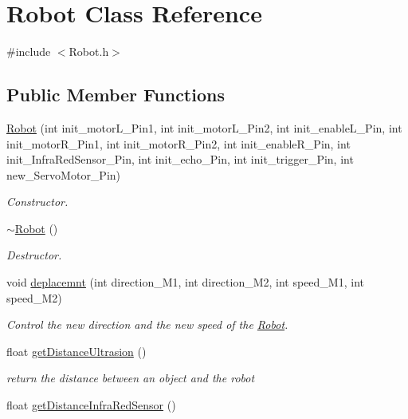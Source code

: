 \hypertarget{class_robot}{}\section{Robot Class Reference}
\label{class_robot}


{\ttfamily \#include $<$Robot.\+h$>$}

\subsection*{Public Member Functions}
\begin{DoxyCompactItemize}
\item 
\hyperlink{class_robot_a48d1e4e995ff63500905212178deb76a}{Robot} (int init\+\_\+motor\+L\+\_\+\+Pin1, int init\+\_\+motor\+L\+\_\+\+Pin2, int init\+\_\+enable\+L\+\_\+\+Pin, int init\+\_\+motor\+R\+\_\+\+Pin1, int init\+\_\+motor\+R\+\_\+\+Pin2, int init\+\_\+enable\+R\+\_\+\+Pin, int init\+\_\+\+Infra\+Red\+Sensor\+\_\+\+Pin, int init\+\_\+echo\+\_\+\+Pin, int init\+\_\+trigger\+\_\+\+Pin, int new\+\_\+\+Servo\+Motor\+\_\+\+Pin)
\begin{DoxyCompactList}\small\item\em Constructor. \end{DoxyCompactList}\item 
\hyperlink{class_robot_a924320124b09c2f2ac1621aa210d5f38}{$\sim$\+Robot} ()
\begin{DoxyCompactList}\small\item\em Destructor. \end{DoxyCompactList}\item 
void \hyperlink{class_robot_a53edd4c7204f04d0bb3e97f1f1574755}{deplacemnt} (int direction\+\_\+\+M1, int direction\+\_\+\+M2, int speed\+\_\+\+M1, int speed\+\_\+\+M2)
\begin{DoxyCompactList}\small\item\em Control the new direction and the new speed of the \hyperlink{class_robot}{Robot}. \end{DoxyCompactList}\item 
float \hyperlink{class_robot_ae3e977cb38b69c31faafd993a2b4054d}{get\+Distance\+Ultrasion} ()
\begin{DoxyCompactList}\small\item\em return the distance between an object and the robot \end{DoxyCompactList}\item 
float \hyperlink{class_robot_a2286627d02563b7a0c4710459bdf54f1}{get\+Distance\+Infra\+Red\+Sensor} ()

\end{DoxyCompactItemize}
